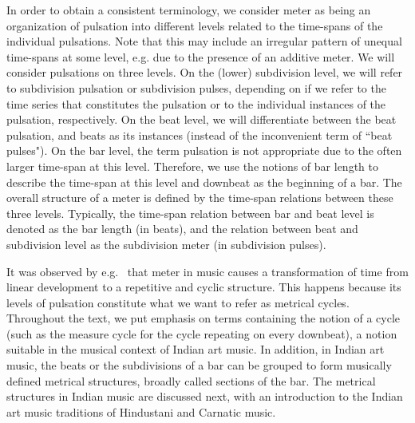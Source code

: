 In order to obtain a consistent terminology, we consider meter as being an organization of pulsation into different levels related to the time-spans of the individual pulsations. Note that this may include an irregular pattern of unequal time-spans at some level, e.g. due to the presence of an additive meter. We will consider pulsations on three levels. On the (lower) subdivision level, we will refer to subdivision pulsation or subdivision pulses, depending on if we refer to the time series that constitutes the pulsation or to the individual instances of the pulsation, respectively. On the beat level, we will differentiate between the beat pulsation, and beats as its instances (instead of the inconvenient term of ``beat pulses"). On the bar level, the term pulsation is not appropriate due to the often larger time-span at this level. Therefore, we use the notions of bar length to describe the time-span at this level and downbeat as the beginning of a bar. The overall structure of a meter is defined by the time-span relations between these three levels. Typically, the time-span relation between bar and beat level is denoted as the bar length (in beats), and the relation between beat and subdivision level as the subdivision meter (in subdivision pulses). 

It was observed by e.g.~ that meter in music causes a transformation of time from linear development to a repetitive and cyclic structure. This happens because its levels of pulsation constitute what we want to refer as metrical cycles. Throughout the text, we put emphasis on terms containing the notion of a cycle (such as the measure cycle for the cycle repeating on every downbeat), a notion suitable in the musical context of Indian art music. In addition, in Indian art music, the beats or the subdivisions of a bar can be grouped to form musically defined metrical structures, broadly called sections of the bar. The metrical structures in Indian music are discussed next, with an introduction to the Indian art music traditions of Hindustani and Carnatic music.
